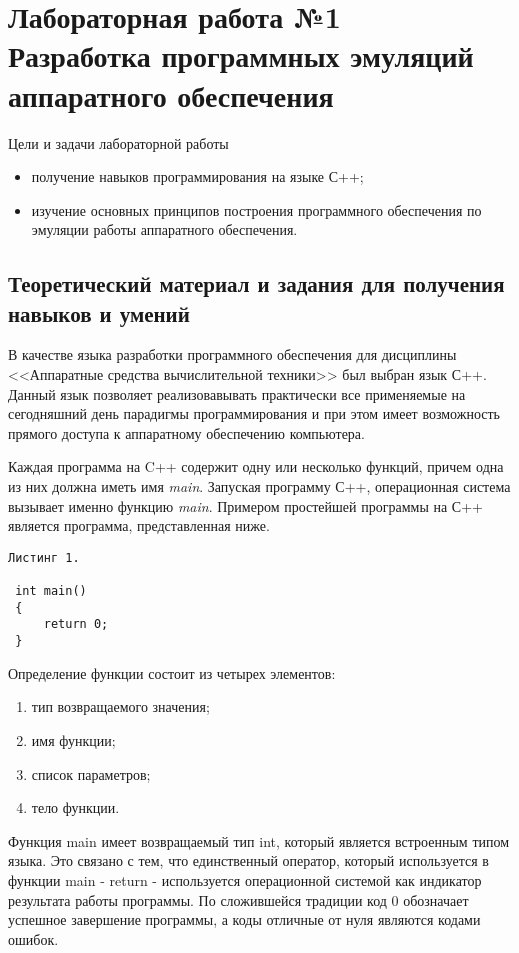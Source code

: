 \documentclass[a4paper,report,14pt]{ncc}
\begin{document}
\section*{Лабораторная работа №1 \\ Разработка программных эмуляций аппаратного обеспечения}

Цели и задачи лабораторной работы

\begin{itemize}
 \item получение навыков программирования на языке С++;
 \item изучение основных принципов построения программного обеспечения по эмуляции работы аппаратного обеспечения.
\end{itemize}


\subsection{Теоретический материал и задания для получения навыков и умений}

В качестве языка разработки программного обеспечения для дисциплины <<Аппаратные средства вычислительной техники>> был выбран язык С++. Данный язык позволяет реализовавывать практически все применяемые на сегодняшний день парадигмы программирования и при этом имеет возможность прямого доступа к аппаратному обеспечению компьютера.

Каждая программа на C++ содержит одну или несколько функций, причем одна из них должна иметь имя \textit{main}. Запуская программу С++, операционная система вызывает именно функцию \textit{main}. Примером простейшей программы на С++ является программа, представленная ниже.

\begin{verbatim}
Листинг 1.

 int main()
 {
     return 0;
 }
\end{verbatim}

Определение функции состоит из четырех элементов:

\begin{enumerate}
 \item тип возвращаемого значения;
 \item имя функции;
 \item список параметров;
 \item тело функции.
\end{enumerate}


Функция main имеет возвращаемый тип int, который является встроенным типом языка. Это связано с тем, что единственный оператор, который используется в функции main - return - используется операционной системой как индикатор результата работы программы. По сложившейся традиции код 0 обозначает успешное завершение программы, а коды отличные от нуля являются кодами ошибок.
\end{document}
